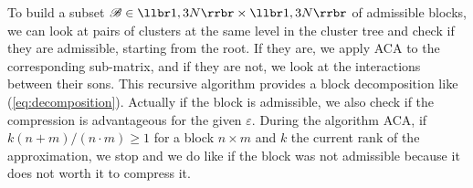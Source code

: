 To build a subset $\mathscr{B} \in \llbr 1,3N \rrbr \times \llbr 1,3N\rrbr $ of admissible blocks, we can look at pairs of clusters at the same level in the cluster tree and check if they are admissible, starting from the root. If they are, we apply ACA to the corresponding sub-matrix, and if they are not, we look at the interactions between their sons. This recursive algorithm provides a block decomposition like (\ref{eq:decomposition}).
Actually if the block is admissible, we also check if the compression is advantageous for the given $\varepsilon$. During the algorithm ACA, if $k(n+m)/(n\cdot m) \geq 1$ for a block $n\times m$ and $k$ the current rank of the approximation, we stop and we do like if the block was not admissible because it does not worth it to compress it.





